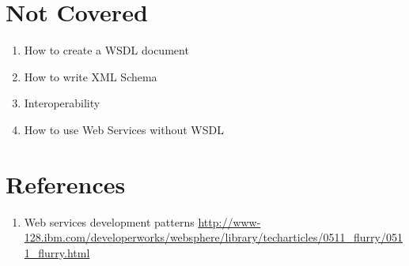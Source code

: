 \section{Not Covered}
\label{section:NC}
\begin{enumerate}
 \item{How to create a WSDL document}
 \item {How to write XML Schema}
 \item {Interoperability}
 \item{How to use Web Services without WSDL}
\end{enumerate}



\section{References}
\begin{enumerate}
 \item{Web services development patterns 
 \url{http://www-128.ibm.com/developerworks/websphere/library/techarticles/0511_flurry/0511_flurry.html}}
\end{enumerate}



